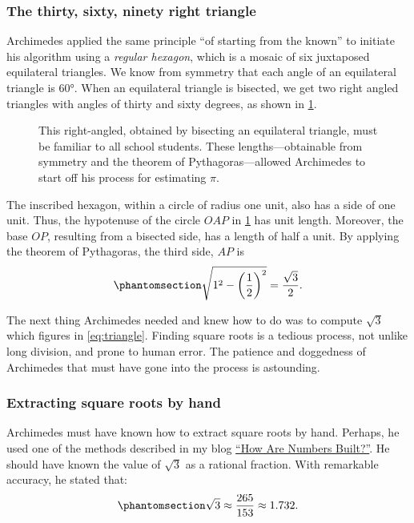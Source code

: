 \documentclass[
  a4paper,
]{article}
\begin{document}
\subsubsection{The thirty, sixty, ninety right
triangle}\label{the-thirty-sixty-ninety-right-triangle}

Archimedes applied the same principle ``of starting from the known'' to
initiate his algorithm using a \emph{regular hexagon}, which is a mosaic
of six juxtaposed equilateral triangles. We know from symmetry that each
angle of an equilateral triangle is \(60°\). When an equilateral
triangle is bisected, we get two right angled triangles with angles of
thirty and sixty degrees, as shown in \cref{fig:thirty-sixty}.

\begin{figure}
\centering

\caption{This right-angled, obtained by bisecting an equilateral
triangle, must be familiar to all school students. These
lengths---obtainable from symmetry and the theorem of
Pythagoras---allowed Archimedes to start off his process for estimating
\(\pi\).}\label{fig:thirty-sixty}
\end{figure}

The inscribed hexagon, within a circle of radius one unit, also has a
side of one unit. Thus, the hypotenuse of the circle \(OAP\) in
\cref{fig:thirty-sixty} has unit length. Moreover, the base \(OP\),
resulting from a bisected side, has a length of half a unit. By applying
the theorem of Pythagoras, the third side, \(AP\) is
\begin{equation}\phantomsection\label{eq:triangle}{
\sqrt{1^2 - \left(\frac{1}{2}\right)^2} = \frac{\sqrt{3}}{2}.
}\end{equation}

The next thing Archimedes needed and knew how to do was to compute
\(\sqrt{3}\) which figures in \cref{eq:triangle}. Finding square roots
is a tedious process, not unlike long division, and prone to human
error. The patience and doggedness of Archimedes that must have gone
into the process is astounding.

\subsubsection{Extracting square roots by
hand}\label{extracting-square-roots-by-hand}

Archimedes must have known how to extract square roots by hand. Perhaps,
he used one of the methods described in my blog
\href{https://swanlotus.netlify.app/blogs/how-are-numbers-built}{``How
Are Numbers Built?''}. He should have known the value of \(\sqrt{3}\) as
a rational fraction. With remarkable accuracy, he stated that:
\begin{equation}\phantomsection\label{eq:sqrt3}{\sqrt{3} \approx \frac{265}{153} \approx 1.732.
}\end{equation}
\end{document}
